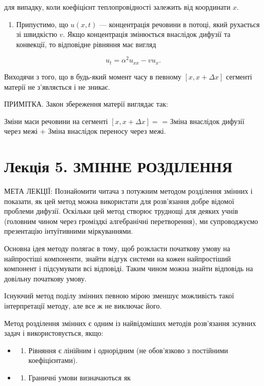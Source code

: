 \documentclass[
  ukrainian,
]{article}
\providecommand{\tightlist}{%
  \setlength{\itemsep}{0pt}\setlength{\parskip}{0pt}}
\begin{document}
для випадку, коли коефіцієнт теплопровідності залежить від координати
\(x\).

\begin{enumerate}
\def\labelenumi{\arabic{enumi}.}
\setcounter{enumi}{3}
\tightlist
\item
  Припустимо, що \(u(x,t)\) --- концентрація речовини в потоці, який
  рухається зі швидкістю \(v\). Якщо концентрація змінюється внаслідок
  дифузії та конвекції, то відповідне рівняння має вигляд
\end{enumerate}

\[
u_t = \alpha^2 u_{xx} - v u_x.
\]

Виходячи з того, що в будь-який момент часу в певному
\([x, x + \Delta x]\) сегменті матерії не з'являється і не зникає.

ПРИМІТКА. Закон збереження матерії виглядає так:

Зміни маси речовини на сегменті \([x, x + \Delta x] =\) = Зміна
внаслідок дифузії через межі + Зміна внаслідок переносу через межі.

\section{Лекція 5. ЗМІННЕ
РОЗДІЛЕННЯ}\label{ux43bux435ux43aux446ux456ux44f-5.-ux437ux43cux456ux43dux43dux435-ux440ux43eux437ux434ux456ux43bux435ux43dux43dux44f}

МЕТА ЛЕКЦІЇ: Познайомити читача з потужним методом розділення змінних і
показати, як цей метод можна використати для розв'язання добре відомої
проблеми дифузії. Оскільки цей метод створює труднощі для деяких учнів
(головним чином через громіздкі алгебранічні перетворення), ми
супроводжуємо презентацію інтуїтивними міркуваннями.

Основна ідея методу полягає в тому, щоб розкласти початкову умову на
найпростіші компоненти, знайти відгук системи на кожен найпростіший
компонент і підсумувати всі відповіді. Таким чином можна знайти
відповідь на довільну початкову умову.

Існуючий метод поділу змінних певною мірою зменшує можливість такої
інтерпретації методу, але все ж не виключає його.

Метод розділення змінних є одним із найвідоміших методів розв'язання
зсувних задач і використовується, якщо:

\begin{itemize}
\tightlist
\item
  \begin{enumerate}
  \def\labelenumi{\arabic{enumi}.}
  \tightlist
  \item
    Рівняння є лінійним і однорідним (не обов'язково з постійними
    коефіцієнтами).
  \end{enumerate}
\item
  \begin{enumerate}
  \def\labelenumi{\arabic{enumi}.}
  \setcounter{enumi}{1}
  \tightlist
  \item
    Граничні умови визначаються як
  \end{enumerate}
\end{itemize}
\end{document}
